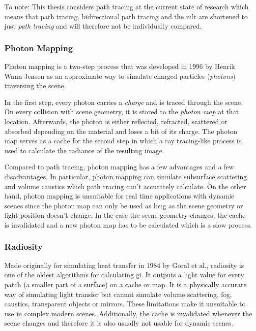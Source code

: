 \documentclass[
  twoside,
  11pt, a4paper,
  footinclude=true,
  headinclude=true,
  cleardoublepage=empty
]{scrreprt}
\begin{document}
To note: This thesis considers path tracing at the current state of research which means that path
tracing, bidirectional path tracing and the \ac{mlt} are shortened to just \emph{path tracing} and
will therefore not be individually compared.

\subsubsection{Photon Mapping}
Photon mapping is a two-step process that was developed in 1996 by Henrik Wann Jensen \cite{inproceedings:photon-mapping} as
an approximate way to simulate charged particles (\emph{photons}) traversing the scene.

In the first step, every photon carries a \emph{charge} and is traced through the scene. On every
collision with scene geometry, it is stored to the \emph{photon map} at that location. Afterwards,
the photon is either reflected, refracted, scattered or absorbed depending on the material and
loses a bit of its charge. The photon map serves as a cache for the second step in which a ray
tracing-like process is used to calculate the radiance of the resulting image.

Compared to path tracing, photon mapping has a few advantages and a few disadvantages. In
particular, photon mapping can simulate subsurface scattering and volume caustics which path
tracing can't accurately calculate. On the other hand, photon mapping is unsuitable for real time
applications with dynamic scenes since the photon map can only be used as long as the scene
geometry or light position doesn't change. In the case the scene geometry changes, the cache is invalidated and a new
photon map has to be calculated which is a slow process.

\subsubsection{Radiosity}
Made originally for simulating heat transfer in 1984 by Goral et al.\cite{article:radiosity},
radiosity is one of the oldest algorithms for calculating \ac{gi}. It outputs a light value for
every patch (a smaller part of a surface) on a cache or map. It is a physically accurate way of
simulating light transfer but cannot simulate volume scattering, fog, caustics, transparent
objects or mirrors. These limitations make it unsuitable to use in complex modern scenes.
Additionally, the cache is invalidated whenever the scene changes and therefore it is also
usually not usable for dynamic scenes.
\end{document}
